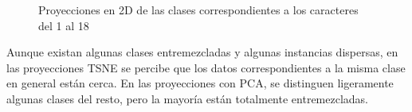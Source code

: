 \documentclass[a4]{article}
\begin{document}
\begin{figure}[H]
  \centering
  \caption{Proyecciones en 2D de las clases correspondientes a los caracteres del 1 al 18}
  \label{fig:digit0-9}
\end{figure}

Aunque existan algunas clases entremezcladas y algunas instancias
dispersas, en las proyecciones TSNE se percibe que los datos
correspondientes a la misma clase en general están cerca. En las
proyecciones con PCA, se distinguen ligeramente algunas clases del
resto, pero la mayoría están totalmente entremezcladas.
\end{document}
